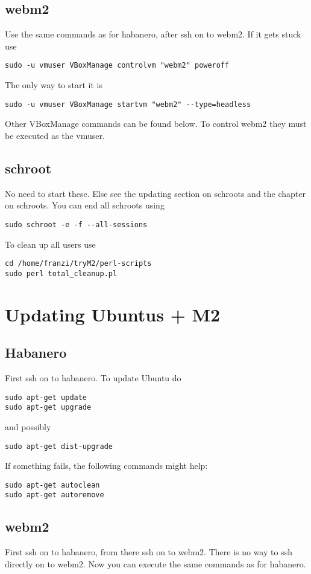 \documentclass[a4paper]{book}
\begin{document}
\subsection{webm2}
Use the same commands as for habanero, after ssh on to webm2. If it gets stuck use
\begin{verbatim}
sudo -u vmuser VBoxManage controlvm "webm2" poweroff
\end{verbatim}
The only way to start it is
\begin{verbatim}
sudo -u vmuser VBoxManage startvm "webm2" --type=headless
\end{verbatim}
Other VBoxManage commands can be found below. To control webm2 they must be executed as the vmuser.
\subsection{schroot}
No need to start these. Else see the updating section on schroots and the chapter on schroots.
You can end all schroots using
\begin{verbatim}
sudo schroot -e -f --all-sessions
\end{verbatim}
To clean up all users use
\begin{verbatim}
cd /home/franzi/tryM2/perl-scripts
sudo perl total_cleanup.pl
\end{verbatim}

\section{Updating Ubuntus + M2}
\subsection{Habanero}
First ssh on to habanero. To update Ubuntu do
\begin{verbatim}
sudo apt-get update
sudo apt-get upgrade
\end{verbatim}
and possibly
\begin{verbatim}
sudo apt-get dist-upgrade
\end{verbatim}
If something fails, the following commands might help:
\begin{verbatim}
sudo apt-get autoclean
sudo apt-get autoremove
\end{verbatim}
\subsection{webm2}
First ssh on to habanero, from there ssh on to webm2. There is no way to ssh directly on to webm2.
Now you can execute the same commands as for habanero.
\end{document}
